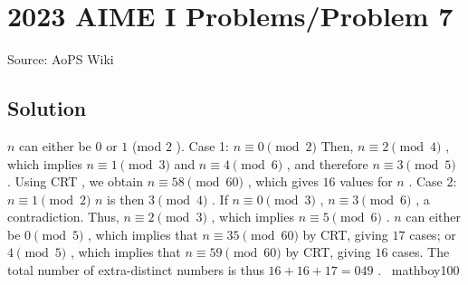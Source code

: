 \documentclass[12pt]{article}
\begin{document}
\section*{{2023 AIME I Problems/Problem 7}}
Source: AoPS Wiki

\subsection*{Solution}
$n$ can either be $0$ or $1$ (mod $2$ ). Case 1: $n \equiv 0 \pmod{2}$ Then, $n \equiv 2 \pmod{4}$ , which implies $n \equiv 1 \pmod{3}$ and $n \equiv 4 \pmod{6}$ , and therefore $n \equiv 3 \pmod{5}$ . Using CRT , we obtain $n \equiv 58 \pmod{60}$ , which gives $16$ values for $n$ . Case 2: $n \equiv 1 \pmod{2}$ $n$ is then $3 \pmod{4}$ . If $n \equiv 0 \pmod{3}$ , $n \equiv 3 \pmod{6}$ , a contradiction. Thus, $n \equiv 2 \pmod{3}$ , which implies $n \equiv 5 \pmod{6}$ . $n$ can either be $0 \pmod{5}$ , which implies that $n \equiv 35 \pmod{60}$ by CRT, giving $17$ cases; or $4 \pmod{5}$ , which implies that $n \equiv 59 \pmod{60}$ by CRT, giving $16$ cases. The total number of extra-distinct numbers is thus $16 + 16 + 17 = \boxed{049}$ . ~mathboy100
\end{document}
